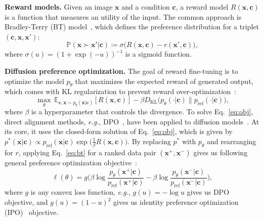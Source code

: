 \vspace{1mm}
\noindent
{\bf Reward models.}
Given an image $\mathbf{x}$ and a condition $\mathbf{c}$, a reward model $R(\mathbf{x}, \mathbf{c})$ is a function that measures an utility of the input. 
The common approach is Bradley-Terry (BT) model~\citep{bradley1952rank, ouyang2022training}, which defines the preference distribution for a triplet $(\mathbf{c}, \mathbf{x}, \mathbf{x}')$:
\begin{equation}\label{eq:bt}
    \mathbb{P}(\mathbf{x} \succ \mathbf{x}' | \mathbf{c}) \coloneqq \sigma\big( R(\mathbf{x}, \mathbf{c}) - r(\mathbf{x}', \mathbf{c})\big )\text{,}
\end{equation}
where $\sigma(u) = (1+\exp(-u))^{-1}$ is a sigmoid function. 


\vspace{1mm}
\noindent
{\bf Diffusion preference optimization.}
The goal of reward fine-tuning is to optimize the model $p_\theta$ that maximizes the expected reward of generated output, which comes with KL regularization to prevent reward over-optimization~\citep{gao2023scaling}:
\begin{equation}\label{eq:obj}
    \max_\theta~\mathbb{E}_{\mathbf{c}, \mathbf{x}\sim p_\theta(\mathbf{x}|\mathbf{c})}[R(\mathbf{x}, \mathbf{c})] - \beta D_{\textrm{KL}}\big(p_\theta(\cdot | \mathbf{c}) \| p_{\textrm{ref}}(\cdot|\mathbf{c})\big)\text{,}
\end{equation}
where $\beta$ is a hyperparameter that controls the divergence.
To solve Eq.~\eqref{eq:obj}, direct alignment methods, \emph{e.g.}, DPO~\citep{rafailov2024direct}, have been applied to diffusion models~\citep{wallace2023diffusion}.
At its core, it uses the closed-form solution of Eq.~\eqref{eq:obj}, which is given by $p^*(\mathbf{x}|\mathbf{c}) \propto p_{\textrm{ref}}(\mathbf{x}|\mathbf{c})\exp\big(\tfrac{1}{\beta}R(\mathbf{x}, \mathbf{c})\big)$.
By replacing $p^*$ with $p_\theta$ and rearranging for $r$, applying Eq.~\eqref{eq:bt} for a ranked data pair $(\mathbf{x}^+, \mathbf{x}^-)$ gives us following general preference optimization objective~\citep{tang2024generalized}:
\begin{equation}\label{eq:dpoloss}
    \ell(\theta) = g \bigg(\beta\log\frac{p_\theta(\mathbf{x}^+|\mathbf{c})}{p_{\textrm{ref}}(\mathbf{x}^+|\mathbf{c})} - \beta\log\frac{p_\theta(\mathbf{x}^-|\mathbf{c})}{p_{\textrm{ref}}(\mathbf{x}^-|\mathbf{c})}\bigg)\text{,}
\end{equation}
where $g$ is any convex loss function, \emph{e.g.}, $g(u) =-\log u$ gives us DPO~\citep{rafailov2024direct} objective, and $g(u) = (1-u)^2$ gives us identity preference optimization (IPO)~\citep{azar2024general} objective.

